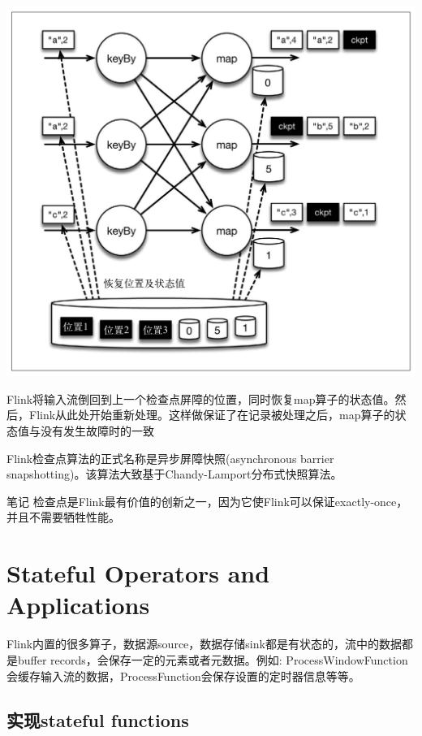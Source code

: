 \documentclass[oneside]{ctexbook}
\begin{document}
\noindent \includegraphics[width=\textwidth]{ckpt6.png}

Flink将输入流倒回到上一个检查点屏障的位置，同时恢复map算子的状态值。然后，Flink从此处开始重新处理。这样做保证了在记录被处理之后，map算子的状态值与没有发生故障时的一致

Flink检查点算法的正式名称是异步屏障快照(asynchronous barrier snapshotting)。该算法大致基于Chandy-Lamport分布式快照算法。

\begin{bclogo}[logo=\bcinfo, couleurBarre=orange, noborder=true, couleur=white]{笔记}
检查点是Flink最有价值的创新之一，因为它使Flink可以保证exactly-once，并且不需要牺牲性能。
\end{bclogo}

\section{Stateful Operators and Applications}

Flink内置的很多算子，数据源source，数据存储sink都是有状态的，流中的数据都是buffer records，会保存一定的元素或者元数据。例如: ProcessWindowFunction会缓存输入流的数据，ProcessFunction会保存设置的定时器信息等等。

\subsection{实现stateful functions}
\end{document}
